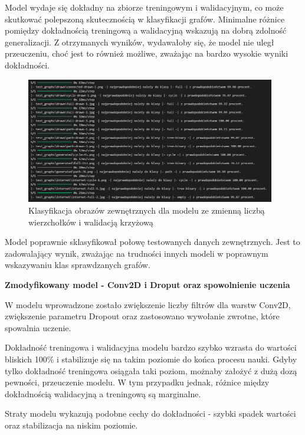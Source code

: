 Model wydaje się dokładny na zbiorze treningowym i walidacyjnym,
co może skutkować polepszoną skutecznością w klasyfikacji grafów.
Minimalne różnice pomiędzy dokładnością treningową a walidacyjną wskazują na dobrą zdolność generalizacji.
Z otrzymanych wyników, wydawałoby się, że model nie uległ przeuczeniu,
choć jest to również możliwe, zważając na bardzo wysokie wyniki dokładności. 

\begin{figure}[ht]
	\centering
	\includegraphics[height=5.5cm]{resources/tests/images/v3/multiple_edges_crossvalid_txt.png}
	\caption{Klasyfikacja obrazów zewnętrznych dla modelu ze zmienną liczbą wierzchołków i walidacją krzyżową}
	\label{Fig:tests-csvar-0b}
\end{figure}
\FloatBarrier

Model poprawnie sklasyfikował połowę testowanych danych zewnętrznych.
Jest to zadowalający wynik, zważając na trudności innych modeli w poprawnym wskazywaniu klas sprawdzanych grafów.

\textbf{Zmodyfikowany model - Conv2D i Droput oraz spowolnienie uczenia}

W modelu wprowadzone zostało zwiększenie liczby filtrów dla warstw Conv2D, zwiększenie parametru Dropout
oraz zastosowano wywołanie zwrotne, które spowalnia uczenie.

Dokładność treningowa i walidacyjna modelu bardzo szybko wzrasta do wartości bliskich 100\%
i stabilizuje się na takim poziomie do końca procesu nauki.
Gdyby tylko dokładność treningowa osiągała taki poziom, możnaby założyć z dużą dozą pewności, przeuczenie modelu.
W tym przypadku jednak, różnice między dokładnością walidacyjną a treningową są marginalne.

Straty modelu wykazują podobne cechy do dokładności - szybki spadek wartości oraz stabilizacja na niskim poziomie.

